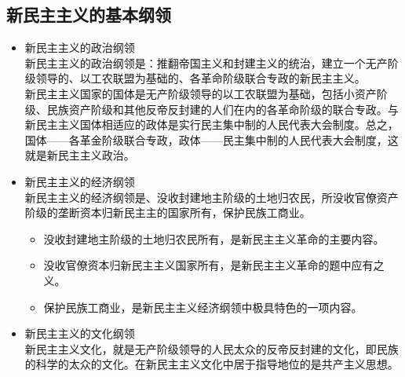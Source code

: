 \subsection{新民主主义的基本纲领}
\begin{itemize}
	\item 新民主主义的政治纲领\\
	\text{\qquad}新民主主义的政治纲领是：推翻帝国主义和封建主义的统治，建立一个无产阶级领导的、以工农联盟为基础的、各革命阶级联合专政的新民主主义。\\
	新民主主义国家的国体是无产阶级领导的以工农联盟为基础，包括小资产阶级、民族资产阶级和其他反帝反封建的人们在内的各革命阶级的联合专政。与新民主主义国体相适应的政体是实行民主集中制的人民代表大会制度。总之，国体——各革金阶级联合专政，政体——民主集中制的人民代表大会制度，这就是新民主主义政治。
	\item 新民主主义的经济纲领\\
	\text{\qquad}新民主主义的经济纲领是、没收封建地主阶级的土地归农民，所没收官僚资产阶级的垄断资本归新民主主的国家所有，保护民族工商业。
	\begin{itemize}
		\item 没收封建地主阶级的土地归农民所有，是新民主主义革命的主要内容。
		\item 没收官僚资本归新民主主义国家所有，是新民主主义革命的题中应有之义。
		\item 保护民族工商业，是新民主主义经济纲领中极具特色的一项内容。
	\end{itemize}
\item 新民主主义的文化纲领\\
\text{\qquad}新民主主义文化，就是无产阶级领导的人民太众的反帝反封建的文化，即民族的科学的太众的文化。在新民主主义文化中居于指导地位的是共产主义思想。
\end{itemize}